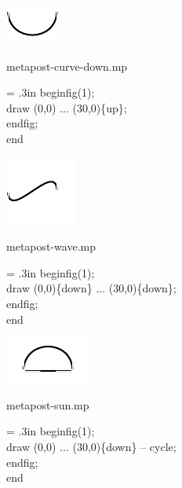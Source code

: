 \documentclass[danish,a2paper,11pt]{scrartcl}
\begin{document}
\begin{multicols*}{3}
\center
\includegraphics[scale=5]{metapoints/metapoints-3.pdf}
\vspace{2cm}

\flushleft
\color{White}
\romansmall
metapost-curve-down.mp\\
\vspace{.4cm}
\color{Black}
\typewritersmall
{\leftskip = .3in
beginfig(1);\\
draw (0,0) ... (30,0)\{up\};\\
endfig;\\
end
\par}
\vspace{2cm}

\center
\includegraphics[scale=5]{metapoints/metapoints-4.pdf}
\vspace{2cm}

\flushleft
\color{White}
\romansmall
metapost-wave.mp\\
\vspace{.4cm}
\color{Black}
\typewritersmall
{\leftskip = .3in
beginfig(1);\\
draw (0,0)\{down\} ... (30,0)\{down\};\\
endfig;\\
end
\par}
\vspace{2cm}

\columnbreak

\center
\includegraphics[scale=5]{metapoints/metapoints-5.pdf}
\vspace{2cm}

\flushleft
\color{White}
\romansmall
metapost-sun.mp\\
\vspace{.4cm}
\color{Black}
\typewritersmall
{\leftskip = .3in
beginfig(1);\\
draw (0,0) ... (30,0)\{down\} -- cycle;\\
endfig;\\
end
\par}
\vspace{2cm}


\end{multicols*}
\end{document}
